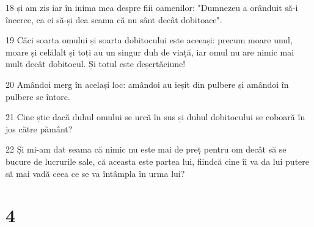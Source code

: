 \par 18 și am zis iar în inima mea despre fiii oamenilor: "Dumnezeu a orânduit să-i încerce, ca ei să-și dea seama că nu sânt decât dobitoace".
\par 19 Căci soarta omului și soarta dobitocului este aceeași: precum moare unul, moare și celălalt și toți au un singur duh de viață, iar omul nu are nimic mai mult decât dobitocul. Și totul este deșertăciune!
\par 20 Amândoi merg în același loc: amândoi au ieșit din pulbere și amândoi în pulbere se întorc.
\par 21 Cine știe dacă duhul omului se urcă în sus și duhul dobitocului se coboară în jos către pământ?
\par 22 Și mi-am dat seama că nimic nu este mai de preț pentru om decât să se bucure de lucrurile sale, că aceasta este partea lui, fiindcă cine îi va da lui putere să mai vadă ceea ce se va întâmpla în urma lui?

\chapter{4}

